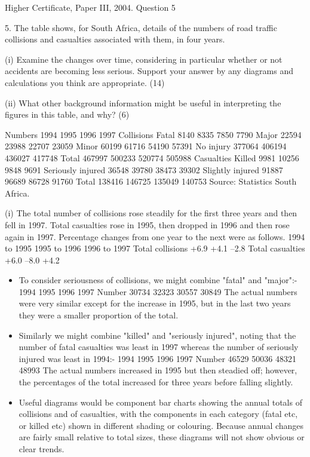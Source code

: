 \documentclass[a4paper,12pt]{article}
\begin{document}
Higher Certificate, Paper III, 2004.  Question 5 
 
\begin{framed}
5. The table shows, for South Africa, details of the numbers of road traffic collisions and casualties associated with them, in four years. 
 
(i) Examine the changes over time, considering in particular whether or not accidents are becoming less serious.  Support your answer by any diagrams and calculations you think are appropriate. (14) 
 
(ii) What other background information might be useful in interpreting the figures in this table, and why? (6) 
 
 
 Numbers  1994 1995 1996 1997      Collisions        Fatal     8140     8335     7850     7790    Major   22594   23988   22707   23059    Minor   60199   61716   54190   57391    No injury 377064 406194 436027 417748 Total 467997 500233 520774 505988      Casualties        Killed     9981   10256     9848     9691    Seriously injured   36548   39780   38473   39302    Slightly injured   91887   96689   86728   91760 Total 138416 146725 135049 140753 
       Source: Statistics South Africa. 

\end{framed} 
(i) The total number of collisions rose steadily for the first three years and then fell in 1997.  Total casualties rose in 1995, then dropped in 1996 and then rose again in 1997.  Percentage changes from one year to the next were as follows. 
  1994 to 1995 1995 to 1996 1996 to 1997 Total collisions +6.9 +4.1 –2.8 Total casualties +6.0 –8.0 +4.2 
\begin{itemize}
    \item To consider seriousness of collisions, we might combine "fatal" and "major":- 
  1994 1995 1996 1997 Number 30734 32323 30557 30849 %
 The actual numbers were very similar except for the increase in 1995, but in the last two years they were a smaller proportion of the total. 
 
    \item Similarly we might combine "killed" and "seriously injured", noting that the number of fatal casualties was least in 1997 whereas the number of seriously injured was least in 1994:- 
  1994 1995 1996 1997 Number 46529 50036 48321 48993 %
 The actual numbers increased in 1995 but then steadied off;  however, the percentages of the total increased for three years before falling slightly. 
 
    \item Useful diagrams would be component bar charts showing the annual totals of collisions and of casualties, with the components in each category (fatal etc, or killed etc) shown in different shading or colouring.  Because annual changes are fairly small relative to total sizes, these diagrams will not show obvious or clear trends. 
\end{itemize} 
\end{document}
